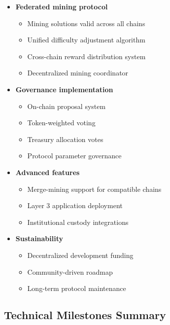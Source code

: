 \documentclass[11pt,a4paper]{article}
\begin{document}
\begin{itemize}
    \item \textbf{Federated mining protocol}
    \begin{itemize}
        \item Mining solutions valid across all chains
        \item Unified difficulty adjustment algorithm
        \item Cross-chain reward distribution system
        \item Decentralized mining coordinator
    \end{itemize}
    \item \textbf{Governance implementation}
    \begin{itemize}
        \item On-chain proposal system
        \item Token-weighted voting
        \item Treasury allocation votes
        \item Protocol parameter governance
    \end{itemize}
    \item \textbf{Advanced features}
    \begin{itemize}
        \item Merge-mining support for compatible chains
        \item Layer 3 application deployment
        \item Institutional custody integrations
    \end{itemize}
    \item \textbf{Sustainability}
    \begin{itemize}
        \item Decentralized development funding
        \item Community-driven roadmap
        \item Long-term protocol maintenance
    \end{itemize}
\end{itemize}

\subsection{Technical Milestones Summary}
\end{document}

